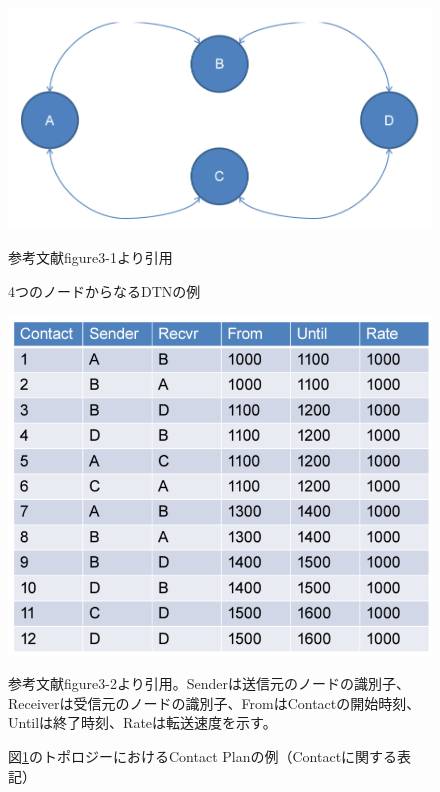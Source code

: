 \begin{figure}[tbh]
    \centering
    \includegraphics[width=0.5\textheight]{img/contact_example_topology.pdf}
    \caption{4つのノードからなるDTNの例}
    \label{fig:contact_example_topology}
    \begin{minipage}{\textwidth}
        \centering
        \vspace{3mm}
        参考文献\cite{schedule_aware_bundle_routing}figure3-1より引用
    \end{minipage}
\end{figure}
\begin{figure}[tbh]
    \centering
    \includegraphics[width=0.5\textheight]{img/contact_example_contactplan.pdf}
    \caption{図\ref{fig:contact_example_topology}のトポロジーにおけるContact Planの例（Contactに関する表記）}
    \label{fig:contact_example_contactplan}
    \begin{minipage}{\textwidth}
        \raggedright
        \vspace{3mm}
        参考文献\cite{schedule_aware_bundle_routing}figure3-2より引用。Senderは送信元のノードの識別子、Receiverは受信元のノードの識別子、FromはContactの開始時刻、Untilは終了時刻、Rateは転送速度を示す。
    \end{minipage}
\end{figure}
